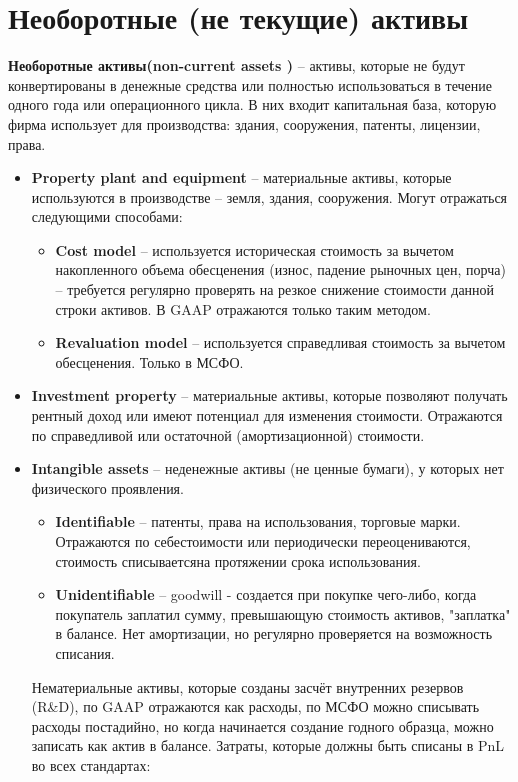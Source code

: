 \documentclass{article}
\begin{document}
\section{Необоротные (не текущие) активы}

\textbf{Необоротные активы(non-current assets )} – активы, которые не будут конвертированы в денежные средства или полностью использоваться в течение одного года или операционного цикла. В них входит капитальная база, которую фирма использует для производства: здания, сооружения, патенты, лицензии, права.
\begin{itemize}
\item \textbf{Property plant and equipment }– материальные  активы, которые используются в производстве – земля, здания, сооружения. Могут отражаться следующими способами: 
\begin{itemize}
\item \textbf{Cost model} –  используется историческая стоимость за вычетом  накопленного объема обесценения (износ, падение рыночных цен, порча) – требуется регулярно проверять на резкое снижение стоимости данной строки активов. В GAAP отражаются только таким методом.
\item \textbf{Revaluation model} – используется справедливая стоимость за вычетом обесценения. Только в МСФО.
\end{itemize}

\item \textbf{Investment property} – материальные активы, которые позволяют получать рентный доход или имеют потенциал для изменения стоимости. Отражаются по справедливой или остаточной (амортизационной) стоимости.
\item \textbf{Intangible assets }– неденежные активы (не ценные бумаги), у которых нет физического проявления.
\begin{itemize}
\item \textbf{Identifiable} -- патенты, права на использования, торговые марки. Отражаются по себестоимости или периодически переоцениваются, стоимость списываетсяна протяжении срока использования.
\item \textbf{Unidentifiable } – goodwill - создается при покупке чего-либо, когда покупатель заплатил сумму, превышающую стоимость активов, "заплатка" в балансе. Нет амортизации, но регулярно проверяется на возможность списания.
\end{itemize}
Нематериальные активы, которые созданы засчёт внутренних резервов (R&D), по GAAP отражаются как расходы, по МСФО можно списывать расходы постадийно, но когда начинается создание годного образца, можно записать как актив в балансе. Затраты, которые должны быть списаны в PnL во всех стандартах:
				

\end{itemize}
\end{document}
